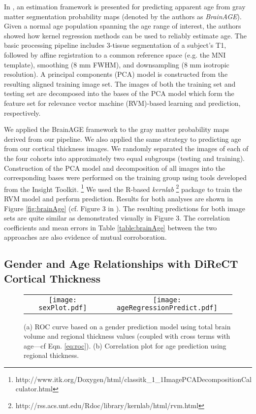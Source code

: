 In \cite{franke2010}, an estimation framework is presented for predicting 
apparent age from gray matter segmentation probability maps (denoted by the authors as {\it BrainAGE}).  
Given a normal age population spanning the age range of interest, the authors showed
how kernel regression methods can be used to reliably estimate age.  The basic processing pipeline includes 3-tissue segmentation
of a subject's T1, followed by affine registration to a common reference space (e.g.
the MNI template), smoothing (8 mm FWHM), and downsampling (8 mm 
isotropic resolution).  A principal components (PCA) model is constructed 
from the resulting aligned training image set.  The images of both the training set and 
testing set are decomposed into the bases of the PCA model which form the feature
set for relevance vector machine (RVM)-based learning and prediction, respectively. 

We applied the BrainAGE framework to the gray matter probability maps derived
from our pipeline.  We also applied the same strategy to predicting age from 
our cortical thickness images.  We randomly separated the images of each of the 
four cohorts into approximately two equal subgroups (testing and training).
Construction of the PCA model and decomposition of all images into the corresponding 
bases were performed on the training group using tools developed from the Insight Toolkit.%
\footnote{
http://www.itk.org/Doxygen/html/classitk\_1\_1ImagePCADecompositionCalculator.html  
}
We used the R-based {\it kernlab}%
\footnote{
http://rss.acs.unt.edu/Rdoc/library/kernlab/html/rvm.html
} 
package to train the RVM model and perform prediction.  Results for both
analyses  are shown in Figure \ref{fig:brainAge} (cf. Figure 3 in \cite{franke2010}).
The resulting predictions for both image sets are quite similar as demonstrated 
visually in Figure 3.  The correlation coefficients and mean errors in Table 
\ref{table:brainAge} between the
two approaches are also evidence of mutual corroboration.

\subsection{Gender and Age Relationships with DiReCT Cortical Thickness}

\begin{figure}
  \centering
  \begin{tabular}{cc}
  \texttt{[image: sexPlot.pdf]} &
  \texttt{[image: ageRegressionPredict.pdf]} 
  \end{tabular}
  \caption{(a) ROC curve based on a gender prediction model using total brain volume and regional thickness values (coupled with cross terms with age---cf Eqn. \ref{eq:roc}).  
  (b) Correlation plot for age prediction using regional thickness.
  }
  \label{fig:sexROC}
\end{figure}

